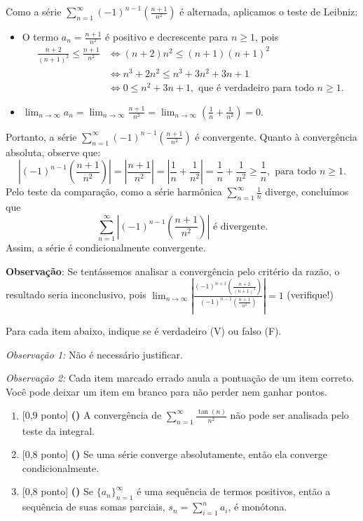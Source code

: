 \documentclass[12pt,a4paper]{article}
\begin{document}
\begin{ExerciseList}
\Answer Como a série \(\sum_{n=1}^{\infty} (-1)^{n-1} \left(\frac{n+1}{n^2}\right)\) é alternada, aplicamos o teste de Leibniz:
\begin{itemize}
    \item O termo \(a_n = \frac{n+1}{n^2}\) é positivo e decrescente para \(n \geq 1\), pois
    \begin{align*}
        \frac{n+2}{(n+1)^2} \leq \frac{n+1}{n^2}
        & \Leftrightarrow
        (n + 2)n^2 \leq (n+1)(n+1)^2 \\
        & \Leftrightarrow
        n^3 + 2n^2 \leq n^3 + 3 n^2 + 3 n + 1 \\
        & \Leftrightarrow
        0 \leq n^2 + 3 n + 1, \text{ que é verdadeiro para todo } n\geq 1.
    \end{align*}
    \item \(\lim_{n \to \infty} a_n = \lim_{n \to \infty} \frac{n+1}{n^2}
    = \lim_{n \to \infty} \left(\frac{1}{n} + \frac{1}{n^2}\right) = 0\).
\end{itemize}
Portanto, a série \(\boxed{\sum_{n=1}^{\infty} (-1)^{n-1}\left(\frac{n+1}{n^2}\right) \text{ é convergente}}\). Quanto à convergência absoluta, observe que:
\[
\left|(-1)^{n-1}\left(\frac{n+1}{n^2}\right)\right|
= \left|\frac{n+1}{n^2}\right|
= \left|\frac{1}{n} + \frac{1}{n^2}\right|
= \frac{1}{n} + \frac{1}{n^2}
\geq \frac{1}{n}, \text{ para todo } n \geq 1.
\]
Pelo teste da comparação, como a série harmônica \(\sum_{n=1}^{\infty} \frac{1}{n}\) diverge, concluímos que
\[
\boxed{\sum_{n=1}^{\infty} \left|(-1)^{n-1}\left(\frac{n+1}{n^2}\right)\right| \text{ é divergente}}.
\]
Assim, a série é condicionalmente convergente.


\textbf{Observação}: Se tentássemos analisar a convergência pelo critério da razão, o resultado seria inconclusivo, pois \(\lim_{n\to\infty} \left|\frac{(-1)^{n+1} \left(\frac{n+2}{(n+1)^2}\right)}{(-1)^{n-1} \left(\frac{n+1}{n^2}\right)} \right| = 1\) (verifique!)

\Exercise[title={2,5}] Para cada item abaixo, indique se é verdadeiro (V) ou falso (F).

\emph{Observação 1:} Não é necessário justificar.

\emph{Observação 2:} Cada item marcado errado anula a pontuação de um item correto. Você pode deixar um item em branco para não perder nem ganhar pontos.

\begin{enumerate}
    \item {[0,9 ponto] \bf (\hspace{.7em})} A convergência de \(\sum_{n=1}^{\infty} \frac{\tan(n)}{n^2}\) não pode ser analisada pelo teste da integral.
    \item {[0,8 ponto] \bf (\hspace{.7em})} Se uma série converge absolutamente, então ela converge condicionalmente.
    \item {[0,8 ponto] \bf (\hspace{.7em})} Se \(\{a_n\}_{n=1}^{\infty}\) é uma sequência de termos positivos, então a sequência de suas somas parciais, \(s_n = \sum_{i=1}^n a_i\), é monótona.
\end{enumerate}


\end{ExerciseList}
\end{document}
